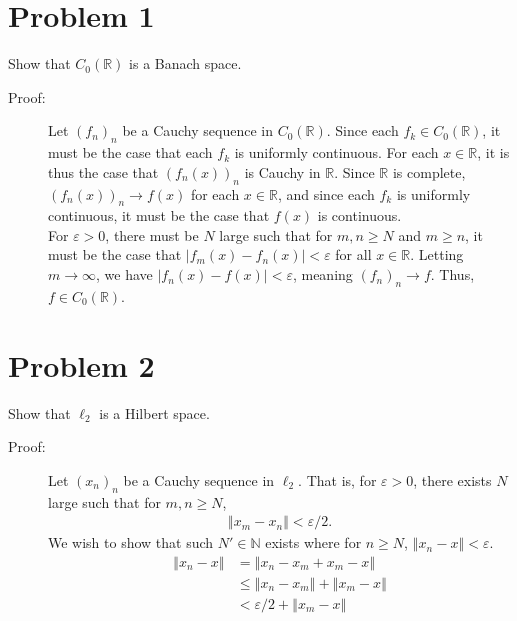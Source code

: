 \documentclass[8pt]{extarticle}
\title{}
\author{}
\date{}
\newcommand{\N}{\mathbb{N}}
\newcommand{\R}{\mathbb{R}}
\newcommand{\norm}[1]{\left\Vert #1\right\Vert}
\begin{document}
  \section{Problem 1}%
  Show that $C_0(\R)$ is a Banach space.
  \begin{description}
    \item[Proof:] Let $(f_n)_n$ be a Cauchy sequence in $C_0(\R)$. Since each $f_k\in C_0(\R)$, it must be the case that each $f_k$ is uniformly continuous. For each $x\in \R$, it is thus the case that $(f_n(x))_n$ is Cauchy in $\R$. Since $\R$ is complete, $(f_n(x))_n\rightarrow f(x)$ for each $x\in \R$, and since each $f_k$ is uniformly continuous, it must be the case that $f(x)$ is continuous.\\

      For $\varepsilon > 0$, there must be $N$ large such that for $m,n\geq N$ and $m\geq n$, it must be the case that $|f_m(x)-f_n(x)| < \varepsilon$ for all $x\in \R$. Letting $m\rightarrow\infty$, we have $|f_n(x)-f(x)| < \varepsilon$, meaning $(f_n)_n\rightarrow f$. Thus, $f\in C_0(\R)$.
  \end{description}
  \section{Problem 2}%
  Show that $\ell_2$ is a Hilbert space.
  \begin{description}
    \item[Proof:] Let $(x_n)_n$ be a Cauchy sequence in $\ell_2$. That is, for $\varepsilon > 0$, there exists $N$ large such that for $m,n\geq N$,
      \begin{align*}
        \norm{x_m - x_n} < \varepsilon/2.
      \end{align*}
      We wish to show that such $N'\in \N$ exists where for $n\geq N$, $\norm{x_n-x} < \varepsilon$.
      \begin{align*}
        \norm{x_n - x} &= \norm{x_n - x_m + x_m - x}\\
                       &\leq \norm{x_n - x_m} + \norm{x_m - x}\\
                       &< \varepsilon/2 + \norm{x_m - x}
      \end{align*}
  \end{description}
\end{document}
